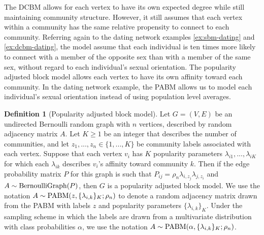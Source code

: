 \documentclass[
  12pt,
]{article}
\theoremstyle{definition}
\newtheorem{definition}{Definition}[section]
\theoremstyle{definition}
\theoremstyle{definition}
\theoremstyle{definition}
\theoremstyle{remark}
\begin{document}
The DCBM allows for each vertex to have its own expected degree while still maintaining community structure.
However, it still assumes that each vertex within a community has the same relative propensity to connect to each community.
Referring again to the dating network examples \ref{ex:sbm-dating} and \ref{ex:dcbm-dating}, the model assume that each individual is ten times more likely to connect with a member of the opposite sex than with a member of the same sex, without regard to each individual's sexual orientation.
The popularity adjusted block model \citep{307cbeb9b1be48299388437423d94bf1} allows each vertex to have its own affinity toward each community.
In the dating network example, the PABM allows us to model each individual's sexual orientation instead of using population level averages.

\begin{definition}[Popularity adjusted block model]
\label{def:pabm}
Let $G = (V, E)$ be an undirected Bernoulli random graph with $n$ vertices, described by random adjacency matrix $A$. 
Let $K \geq 1$ be an integer that describes the number of communities, and let 
$z_1, ..., z_n \in \{1, ..., K\}$ be community labels associated with each vertex. 
Suppose that each vertex $v_i$ has $K$ popularity parameters $\lambda_{i1}, ..., \lambda_{iK}$ for which each $\lambda_{ik}$ describes $v_i$'s affinity toward community $k$. 
Then if the edge probability matrix $P$ for this graph is such that $P_{ij} = \rho_n \lambda_{i, z_j} \lambda_{j, z_i}$ and $A \sim \mathrm{BernoulliGraph}(P)$, then $G$ is a popularity adjusted block model.
We use the notation $A \sim \mathrm{PABM}(z, \{\lambda_{i, k}\}_K; \rho_n)$ to denote a random adjacency matrix drawn from the PABM with labels $z$ and popularity parameters $\{\lambda_{i, k}\}_K$. 
Under the sampling scheme in which the labels are drawn from a multivariate distribution with class probabilities $\alpha$, we use the notation $A \sim \mathrm{PABM}(\alpha, \{\lambda_{i, k}\}_K; \rho_n)$. 
\end{definition}
\end{document}
